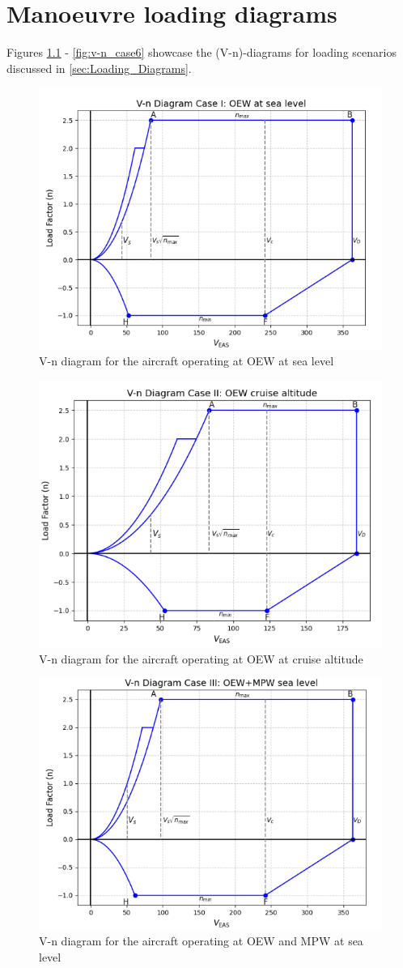 \chapter{Manoeuvre loading diagrams}
\label{v-n_diagrams}
Figures \ref{fig:v-n_case1} - \ref{fig:v-n_case6} showcase the (V-n)-diagrams for loading scenarios discussed in \autoref{sec:Loading_Diagrams}.


\begin{figure}[H]
    \centering
    \includegraphics[width=0.65\linewidth]{figures/v-n diagram case I.png}
    \caption{V-n diagram for the aircraft operating at OEW at sea level}
    \label{fig:v-n_case1}
\end{figure}

\begin{figure}[H]
    \centering
    \includegraphics[width=0.65\linewidth]{figures/v-n diagram case II.png}
    \caption{V-n diagram for the aircraft operating at OEW at cruise altitude}
    \label{fig:v-n_case2}
\end{figure}

\begin{figure}[H]
    \centering
    \includegraphics[width=0.65\linewidth]{figures/v-n diagram case III.png}
    \caption{V-n diagram for the aircraft operating at OEW and MPW at sea level}
    \label{fig:v-n_case3}
\end{figure}

